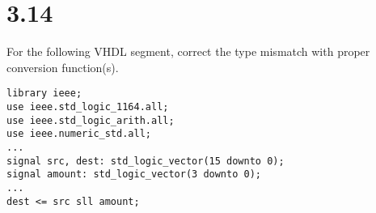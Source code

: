 \documentclass[dvipsnames, svgnames, x11names, a4paper,12pt]{article}
\begin{document}
\section{3.14}    
 For the following VHDL segment, correct the type mismatch with proper conversion
function(s).
\begin{lstlisting}
library ieee;
use ieee.std_logic_1164.all;
use ieee.std_logic_arith.all;
use ieee.numeric_std.all;
...
signal src, dest: std_logic_vector(15 downto 0);
signal amount: std_logic_vector(3 downto 0);
...
dest <= src sll amount;
\end{lstlisting}
\end{document}
